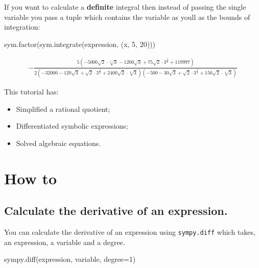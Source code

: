 If you want to calculate a \textbf{definite} integral then instead of passing the
single variable you pass a tuple which contains the variable as youll as the
bounds of integration:




\begin{pyin}
sym.factor(sym.integrate(expression, (x, 5, 20)))
\end{pyin}




\begin{equation*}
\begin{split}\displaystyle - \frac{5 \left(- 5000 \sqrt{2} \cdot \sqrt[4]{3} - 1200 \sqrt{3} + 75 \sqrt{2} \cdot 3^{\frac{3}{4}} + 119997\right)}{2 \left(-32000 - 120 \sqrt{3} + \sqrt{2} \cdot 3^{\frac{3}{4}} + 2400 \sqrt{2} \cdot \sqrt[4]{3}\right) \left(-500 - 30 \sqrt{3} + \sqrt{2} \cdot 3^{\frac{3}{4}} + 150 \sqrt{2} \cdot \sqrt[4]{3}\right)}\end{split}
\end{equation*}



\begin{note}
This tutorial has:
\begin{itemize}

\item 
    Simplified a rational quotient;

\item 

Differentiated symbolic expressions;


\item 

Solved algebraic equations.

\end{itemize}
\end{note}




\section{How to}

\subsection{Calculate the derivative of an expression.}

You can calculate the derivative of an expression using \texttt{sympy.diff} which takes,
an expression, a variable and a degree.


\begin{api}
sympy.diff(expression, variable, degree=1)
\end{api}



